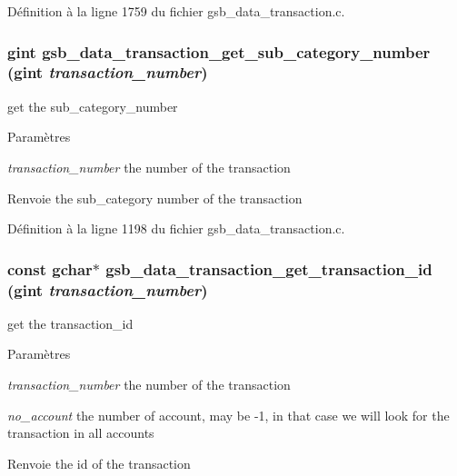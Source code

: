 Définition à la ligne 1759 du fichier gsb\_\-data\_\-transaction.c.

\subsubsection[{gsb\_\-data\_\-transaction\_\-get\_\-sub\_\-category\_\-number}]{\setlength{\rightskip}{0pt plus 5cm}gint gsb\_\-data\_\-transaction\_\-get\_\-sub\_\-category\_\-number (gint {\em transaction\_\-number})}\label{gsb__data__transaction_8c_a2e0ed6fbd584d4363d75e4b0155660b7}
get the sub\_\-category\_\-number 
\begin{DoxyParams}{Paramètres}
\item[{\em transaction\_\-number}]the number of the transaction \end{DoxyParams}
\begin{DoxyReturn}{Renvoie}
the sub\_\-category number of the transaction 
\end{DoxyReturn}


Définition à la ligne 1198 du fichier gsb\_\-data\_\-transaction.c.

\subsubsection[{gsb\_\-data\_\-transaction\_\-get\_\-transaction\_\-id}]{\setlength{\rightskip}{0pt plus 5cm}const gchar$\ast$ gsb\_\-data\_\-transaction\_\-get\_\-transaction\_\-id (gint {\em transaction\_\-number})}\label{gsb__data__transaction_8c_ad171eaf081403c90154beddf8521983f}
get the transaction\_\-id 
\begin{DoxyParams}{Paramètres}
\item[{\em transaction\_\-number}]the number of the transaction \item[{\em no\_\-account}]the number of account, may be -\/1, in that case we will look for the transaction in all accounts \end{DoxyParams}
\begin{DoxyReturn}{Renvoie}
the id of the transaction 
\end{DoxyReturn}


